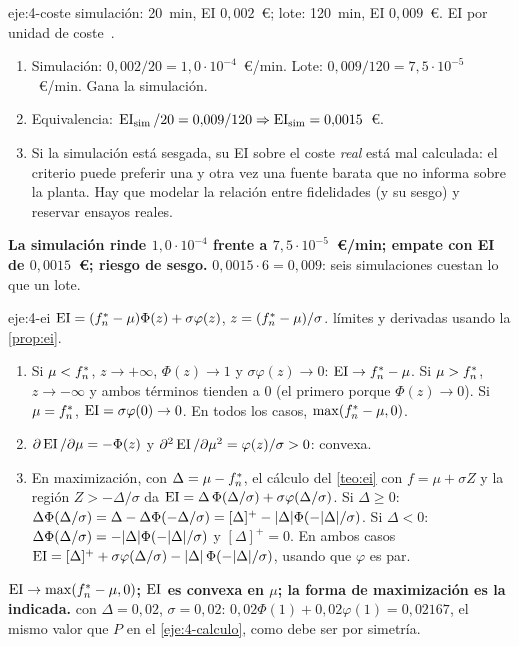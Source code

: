\begin{solucion}{eje:4-coste}
\datos simulación: 20~min, EI $0{,}002$~€; lote: 120~min, EI $0{,}009$~€.
\planteamiento EI por unidad de coste~\cite{snoek}.
\pasos
\begin{enumerate}[label=\arabic*.]
  \item Simulación: $0{,}002/20=1{,}0\cdot10^{-4}$~€/min. Lote: $0{,}009/120=7{,}5\cdot10^{-5}$~€/min. Gana la simulación.
  \item Equivalencia: $\operatorname{EI}_{\text{sim}}/20=0{,}009/120\Rightarrow\operatorname{EI}_{\text{sim}}=0{,}0015$~€.
  \item Si la simulación está sesgada, su EI sobre el coste \emph{real} está mal calculada: el criterio puede preferir una y otra vez una fuente barata que no informa sobre la planta. Hay que modelar la relación entre fidelidades (y su sesgo) y reservar ensayos reales.
\end{enumerate}
\resultado \textbf{La simulación rinde $1{,}0\cdot10^{-4}$ frente a $7{,}5\cdot10^{-5}$~€/min; empate con EI de $0{,}0015$~€; riesgo de sesgo.}
\comprobacion $0{,}0015\cdot6=0{,}009$: seis simulaciones cuestan lo que un lote.
\end{solucion}

\begin{solucion}{eje:4-ei}
\datos $\operatorname{EI}=(f^{*}_{n}-\mu)\Phi(z)+\sigma\varphi(z)$, $z=(f^{*}_{n}-\mu)/\sigma$.
\planteamiento límites y derivadas usando la \cref{prop:ei}.
\pasos
\begin{enumerate}[label=(\alph*)]
  \item Si $\mu<f^{*}_{n}$, $z\to+\infty$, $\Phi(z)\to1$ y $\sigma\varphi(z)\to0$: $\operatorname{EI}\to f^{*}_{n}-\mu$. Si $\mu>f^{*}_{n}$, $z\to-\infty$ y ambos términos tienden a 0 (el primero porque $\Phi(z)\to0$). Si $\mu=f^{*}_{n}$, $\operatorname{EI}=\sigma\varphi(0)\to0$. En todos los casos, $\max(f^{*}_{n}-\mu,0)$.
  \item $\partial\operatorname{EI}/\partial\mu=-\Phi(z)$ y $\partial^2\operatorname{EI}/\partial\mu^2=\varphi(z)/\sigma>0$: convexa.
  \item En maximización, con $\Delta=\mu-f^{*}_{n}$, el cálculo del \cref{teo:ei} con $f=\mu+\sigma Z$ y la región $Z>-\Delta/\sigma$ da $\operatorname{EI}=\Delta\,\Phi(\Delta/\sigma)+\sigma\varphi(\Delta/\sigma)$. Si $\Delta\ge0$: $\Delta\Phi(\Delta/\sigma)=\Delta-\Delta\Phi(-\Delta/\sigma)=[\Delta]^+-\lvert\Delta\rvert\Phi(-\lvert\Delta\rvert/\sigma)$. Si $\Delta<0$: $\Delta\Phi(\Delta/\sigma)=-\lvert\Delta\rvert\Phi(-\lvert\Delta\rvert/\sigma)$ y $[\Delta]^+=0$. En ambos casos $\operatorname{EI}=[\Delta]^++\sigma\varphi(\Delta/\sigma)-\lvert\Delta\rvert\,\Phi(-\lvert\Delta\rvert/\sigma)$, usando que $\varphi$ es par.
\end{enumerate}
\resultado \textbf{$\operatorname{EI}\to\max(f^{*}_{n}-\mu,0)$; $\operatorname{EI}$ es convexa en $\mu$; la forma de maximización es la indicada.}
\comprobacion con $\Delta=0{,}02$, $\sigma=0{,}02$: $0{,}02\Phi(1)+0{,}02\varphi(1)=0{,}02167$, el mismo valor que $P$ en el \cref{eje:4-calculo}, como debe ser por simetría.
\end{solucion}

